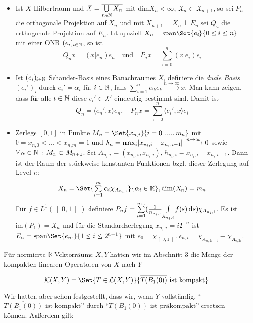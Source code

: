 \documentclass{cheat-sheet}
\newcommand{\K}{\mathbb{K}}
\begin{document}
\begin{itemize}
  \item Ist $X$ Hilbertraum und $X = \overline{\bigcup_{n \in \N} X_n}$ mit $\mathrm{dim} X_n < \infty$, $X_n \subset X_{n+1}$, so sei $P_n$ die orthogonale Projektion auf $X_n$ und mit $X_{n+1} = X_n \perp E_n$ sei $Q_n$ die orthogonale Projektion auf $E_n$. Ist speziell $X_n = \mathrm{span} \Set{ e_i }{ 0 \leq i \leq n }$ mit einer ONB $(e_i)_{i \in \mathbb{N}}$, so ist
  \[ Q_n x = (x | e_n) e_n \quad \text{und} \quad P_n x = \sum_{i=0}^n (x|e_i) e_i \]
  \item Ist $(e_i)_{i \in \mathbb{N}}$ Schauder-Basis eines Banachraumes $X$, definiere die \emph{duale Basis} $(e_i')_i$ durch $e_i' = \alpha_i$ für $i \in \mathbb{N}$, falls $\sum_{i=1}^n \alpha_k e_k \xrightarrow{n \to \infty} x$. Man kann zeigen, dass für alle $i \in \mathbb{N}$ diese $e_i' \in X'$ eindeutig bestimmt sind. Damit ist
  \[ Q_n = \langle e_n', x \rangle e_n, \quad P_n x = \sum_{i=0}^n \langle e_i', x \rangle e_i \]
  \item Zerlege $[0, 1]$ in Punkte $M_n = \Set{ x_{n,i} }{ i = 0, ...., m_n }$ mit $0 = x_{n,0} < ... < x_{n,m} = 1$ und $h_n = \max_{i} \lvert x_{n_i,i} - x_{n_i,i-1}\rvert \xrightarrow{n \to \infty} 0$ sowie $\forall \, {n \in \mathbb{N}} \,:\, M_n \subset M_{n+1}$. Sei $A_{n_i,i} = (x_{n_i,i}, x_{n_i,i})$, $h_{n_i,i} = x_{n_i,i} - x_{n_i,i-1}$. Dann ist der Raum der stückweise konstanten Funktionen bzgl. dieser Zerlegung auf Level $n$:
  \[ X_n = \Set{ \sum_{i=1}^m \alpha_i \chi_{A_{n_i,i}} }{ \alpha_i \in \K }, \mathrm{dim}(X_n) = m_n \]
  Für $f \in L^1(\left] 0, 1 \right[)$ definiere $P_n f = \sum_{i=1}^{m_n} (\frac{1}{n_{n_i,i}} \Int{A_{n_i,i}}{}{f(s)}{s}) \chi_{A_{n_i,i}}$.
  Es ist $\mathrm{im}(P_1) = X_n$ und für die Standardzerlegung $x_{n_i,i} = i 2^{-n}$ ist $E_n = \mathrm{span} \Set{ e_{n_i} }{  1 \leq i \leq 2^{n-1} }$ mit $e_0 = \chi_{\left] 0, 1 \right[}, e_{n,i} = \chi_{A_{n,2i-1}} - \chi_{A_{n,2i}}$.
\end{itemize}



Für normierte $\K$-Vektorräume $X, Y$ hatten wir im Abschnitt 3 die Menge der kompakten linearen Operatoren von $X$ nach $Y$

\[ \mathcal{K}(X, Y) = \Set{ T \in \mathcal{L}(X, Y) }{ \overline{T(B_1(0))} \text{ ist kompakt} } \]

Wir hatten aber schon festgestellt, dass wir, wenn $Y$ vollständig, "`$\overline{T(B_1(0))} \text{ ist kompakt}$"' durch "`$T(B_1(0)) \text{ ist präkompakt}$"' ersetzen können. Außerdem gilt:
\end{document}
